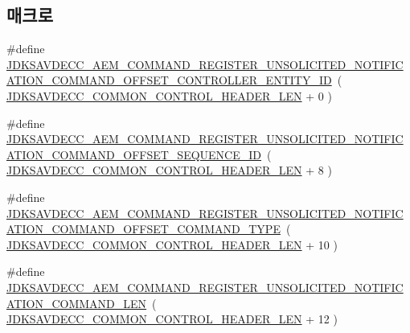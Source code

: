 \subsection*{매크로}
\begin{DoxyCompactItemize}
\item 
\#define \hyperlink{group__command__register__unsolicited__notification_ga3a39544ad1cea90df3595800b8690c73}{J\+D\+K\+S\+A\+V\+D\+E\+C\+C\+\_\+\+A\+E\+M\+\_\+\+C\+O\+M\+M\+A\+N\+D\+\_\+\+R\+E\+G\+I\+S\+T\+E\+R\+\_\+\+U\+N\+S\+O\+L\+I\+C\+I\+T\+E\+D\+\_\+\+N\+O\+T\+I\+F\+I\+C\+A\+T\+I\+O\+N\+\_\+\+C\+O\+M\+M\+A\+N\+D\+\_\+\+O\+F\+F\+S\+E\+T\+\_\+\+C\+O\+N\+T\+R\+O\+L\+L\+E\+R\+\_\+\+E\+N\+T\+I\+T\+Y\+\_\+\+ID}~( \hyperlink{group__jdksavdecc__avtp__common__control__header_gaae84052886fb1bb42f3bc5f85b741dff}{J\+D\+K\+S\+A\+V\+D\+E\+C\+C\+\_\+\+C\+O\+M\+M\+O\+N\+\_\+\+C\+O\+N\+T\+R\+O\+L\+\_\+\+H\+E\+A\+D\+E\+R\+\_\+\+L\+EN} + 0 )
\item 
\#define \hyperlink{group__command__register__unsolicited__notification_gaf5e944d6e0b477ad9e59ee3a51cf7f9f}{J\+D\+K\+S\+A\+V\+D\+E\+C\+C\+\_\+\+A\+E\+M\+\_\+\+C\+O\+M\+M\+A\+N\+D\+\_\+\+R\+E\+G\+I\+S\+T\+E\+R\+\_\+\+U\+N\+S\+O\+L\+I\+C\+I\+T\+E\+D\+\_\+\+N\+O\+T\+I\+F\+I\+C\+A\+T\+I\+O\+N\+\_\+\+C\+O\+M\+M\+A\+N\+D\+\_\+\+O\+F\+F\+S\+E\+T\+\_\+\+S\+E\+Q\+U\+E\+N\+C\+E\+\_\+\+ID}~( \hyperlink{group__jdksavdecc__avtp__common__control__header_gaae84052886fb1bb42f3bc5f85b741dff}{J\+D\+K\+S\+A\+V\+D\+E\+C\+C\+\_\+\+C\+O\+M\+M\+O\+N\+\_\+\+C\+O\+N\+T\+R\+O\+L\+\_\+\+H\+E\+A\+D\+E\+R\+\_\+\+L\+EN} + 8 )
\item 
\#define \hyperlink{group__command__register__unsolicited__notification_gaae936211eb10a305fdc38149e8091689}{J\+D\+K\+S\+A\+V\+D\+E\+C\+C\+\_\+\+A\+E\+M\+\_\+\+C\+O\+M\+M\+A\+N\+D\+\_\+\+R\+E\+G\+I\+S\+T\+E\+R\+\_\+\+U\+N\+S\+O\+L\+I\+C\+I\+T\+E\+D\+\_\+\+N\+O\+T\+I\+F\+I\+C\+A\+T\+I\+O\+N\+\_\+\+C\+O\+M\+M\+A\+N\+D\+\_\+\+O\+F\+F\+S\+E\+T\+\_\+\+C\+O\+M\+M\+A\+N\+D\+\_\+\+T\+Y\+PE}~( \hyperlink{group__jdksavdecc__avtp__common__control__header_gaae84052886fb1bb42f3bc5f85b741dff}{J\+D\+K\+S\+A\+V\+D\+E\+C\+C\+\_\+\+C\+O\+M\+M\+O\+N\+\_\+\+C\+O\+N\+T\+R\+O\+L\+\_\+\+H\+E\+A\+D\+E\+R\+\_\+\+L\+EN} + 10 )
\item 
\#define \hyperlink{group__command__register__unsolicited__notification_ga6438f824be9cf76e1038ed8b5bc14bf9}{J\+D\+K\+S\+A\+V\+D\+E\+C\+C\+\_\+\+A\+E\+M\+\_\+\+C\+O\+M\+M\+A\+N\+D\+\_\+\+R\+E\+G\+I\+S\+T\+E\+R\+\_\+\+U\+N\+S\+O\+L\+I\+C\+I\+T\+E\+D\+\_\+\+N\+O\+T\+I\+F\+I\+C\+A\+T\+I\+O\+N\+\_\+\+C\+O\+M\+M\+A\+N\+D\+\_\+\+L\+EN}~( \hyperlink{group__jdksavdecc__avtp__common__control__header_gaae84052886fb1bb42f3bc5f85b741dff}{J\+D\+K\+S\+A\+V\+D\+E\+C\+C\+\_\+\+C\+O\+M\+M\+O\+N\+\_\+\+C\+O\+N\+T\+R\+O\+L\+\_\+\+H\+E\+A\+D\+E\+R\+\_\+\+L\+EN} + 12 )
\end{DoxyCompactItemize}
